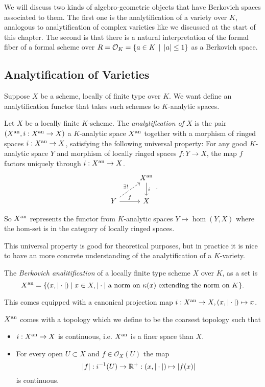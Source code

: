 We will discuss two kinds of algebro-geometric objects that have Berkovich spaces associated to them. 
The first one is the analytification of a variety over $K$, analogous to analytification of complex varieties like we discussed at the start of this chapter. 
The second is that there is a natural interpretation of the formal fiber of a formal scheme over $R = \mathcal{O}_K = \{a \in K \st |a| \le 1\} $ as a Berkovich space. 


\subsection{Analytification of Varieties} \label{sec:analytfication_of_varieties}


Suppose $X$ be a scheme, locally of finite type over $K$.  We want define an analytification functor that takes such schemes to $K$-analytic spaces.  
\begin{definition}
	Let  $X$ be a locally finite $K$-scheme. 
	The \emph{analytification of $X$} is the pair $(X{}^{\text{an}}, i: X{}^{\text{an}} \to X)$ a $K$-analytic space $X{}^{\text{an}}$ together with a morphism of ringed spaces $i: X{}^{\text{an}} \to X$, satisfying the following universal property:
	For any good $K$-analytic space $Y$ and morphism of locally ringed spaces $f: Y \to X$, the map $f$ factors uniquely through $i: X{}^{\text{an}} \to X$. 
	\[
	\begin{tikzcd}
		 & X\an \dar{i} \\
		Y \rar{f} \ar[dashed]{ur}{\exists !} & X
	\end{tikzcd}
	.\] 
\end{definition}
So $X{}^{\text{an}}$ represents the functor from $K$-analytic spaces $Y \mapsto \hom(Y, X)$ where the hom-set is in the category of locally ringed spaces. 

This universal property is good for theoretical purposes, but in practice it is nice to have an more concrete understanding of the analytification of a $K$-variety. 
\begin{definition}\label{def:berkovich_analytification_explicit}
	The \emph{Berkovich analitification} of a locally finite type scheme $X$ over  $K$, as a set is \[
		X{}^{\text{an}} = \{(x, |\cdot |)  \mid x\in X, |\cdot | \text{ a norm on } \kappa(x) \text{ extending the norm on }K \} 
	.\] 

	This comes equipped with a canonical projection map $i: X{}^{\text{an}} \to X, (x, |\cdot |) \mapsto  x$.
	
	$X{}^{\text{an}} $ comes with a topology which we define to be the coarsest topology such that 
	\begin{itemize}
		\item $i: X{}^{\text{an}} \to X$ is continuous, i.e. $X{}^{\text{an}}$ is a finer space than  $X$. 
		\item For every open $U \subset X$ and $f \in \mathcal{O}_X(U)$ the map  \[
				|f|: i^{-1}(U) \to \mathbb{R}^{+}: (x, |\cdot |) \mapsto  |f(x)|
		\] 
		is continuous.
	\end{itemize}

\end{definition}

